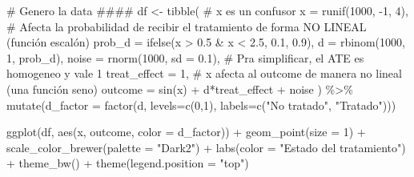 \documentclass[
  letterpaper,
  DIV=11,
  numbers=noendperiod,
  oneside]{scrreprt}
\newenvironment{Shaded}{\begin{snugshade}}{\end{snugshade}}
\newcommand{\AttributeTok}[1]{\textcolor[rgb]{0.40,0.45,0.13}{#1}}
\newcommand{\CommentTok}[1]{\textcolor[rgb]{0.37,0.37,0.37}{#1}}
\newcommand{\DecValTok}[1]{\textcolor[rgb]{0.68,0.00,0.00}{#1}}
\newcommand{\FloatTok}[1]{\textcolor[rgb]{0.68,0.00,0.00}{#1}}
\newcommand{\FunctionTok}[1]{\textcolor[rgb]{0.28,0.35,0.67}{#1}}
\newcommand{\NormalTok}[1]{\textcolor[rgb]{0.00,0.23,0.31}{#1}}
\newcommand{\OtherTok}[1]{\textcolor[rgb]{0.00,0.23,0.31}{#1}}
\newcommand{\SpecialCharTok}[1]{\textcolor[rgb]{0.37,0.37,0.37}{#1}}
\newcommand{\StringTok}[1]{\textcolor[rgb]{0.13,0.47,0.30}{#1}}
\begin{document}
\begin{Shaded}
\begin{Highlighting}[]
\CommentTok{\# Genero la data \#\#\#\#}
\NormalTok{df }\OtherTok{\textless{}{-}} \FunctionTok{tibble}\NormalTok{(}
  \CommentTok{\# x es un confusor}
  \AttributeTok{x =} \FunctionTok{runif}\NormalTok{(}\DecValTok{1000}\NormalTok{, }\SpecialCharTok{{-}}\DecValTok{1}\NormalTok{, }\DecValTok{4}\NormalTok{),}
  \CommentTok{\# Afecta la probabilidad de recibir el tratamiento de forma NO LINEAL (función escalón)}
  \AttributeTok{prob\_d =} \FunctionTok{ifelse}\NormalTok{(x }\SpecialCharTok{\textgreater{}} \FloatTok{0.5} \SpecialCharTok{\&}\NormalTok{ x }\SpecialCharTok{\textless{}} \FloatTok{2.5}\NormalTok{, }\FloatTok{0.1}\NormalTok{, }\FloatTok{0.9}\NormalTok{),}
  \AttributeTok{d =} \FunctionTok{rbinom}\NormalTok{(}\DecValTok{1000}\NormalTok{, }\DecValTok{1}\NormalTok{, prob\_d),}
  \AttributeTok{noise =} \FunctionTok{rnorm}\NormalTok{(}\DecValTok{1000}\NormalTok{, }\AttributeTok{sd =} \FloatTok{0.1}\NormalTok{),}
  \CommentTok{\# Pra simplificar, el ATE es homogeneo y vale 1}
  \AttributeTok{treat\_effect =} \DecValTok{1}\NormalTok{,}
  \CommentTok{\# x afecta al outcome de manera no lineal (una función seno)}
  \AttributeTok{outcome =} \FunctionTok{sin}\NormalTok{(x) }\SpecialCharTok{+}\NormalTok{ d}\SpecialCharTok{*}\NormalTok{treat\_effect }\SpecialCharTok{+}\NormalTok{ noise}
\NormalTok{) }\SpecialCharTok{\%\textgreater{}\%} 
  \FunctionTok{mutate}\NormalTok{(}\AttributeTok{d\_factor =} \FunctionTok{factor}\NormalTok{(d,}
                           \AttributeTok{levels=}\FunctionTok{c}\NormalTok{(}\DecValTok{0}\NormalTok{,}\DecValTok{1}\NormalTok{), }\AttributeTok{labels=}\FunctionTok{c}\NormalTok{(}\StringTok{"No tratado"}\NormalTok{,}
                                                   \StringTok{"Tratado"}\NormalTok{)))}

\FunctionTok{ggplot}\NormalTok{(df,}
       \FunctionTok{aes}\NormalTok{(x, outcome, }\AttributeTok{color =}\NormalTok{ d\_factor)) }\SpecialCharTok{+}
  \FunctionTok{geom\_point}\NormalTok{(}\AttributeTok{size =} \DecValTok{1}\NormalTok{) }\SpecialCharTok{+} 
  \FunctionTok{scale\_color\_brewer}\NormalTok{(}\AttributeTok{palette =} \StringTok{"Dark2"}\NormalTok{) }\SpecialCharTok{+}
  \FunctionTok{labs}\NormalTok{(}\AttributeTok{color =} \StringTok{"Estado del tratamiento"}\NormalTok{) }\SpecialCharTok{+}
  \FunctionTok{theme\_bw}\NormalTok{() }\SpecialCharTok{+}
  \FunctionTok{theme}\NormalTok{(}\AttributeTok{legend.position =} \StringTok{"top"}\NormalTok{)}
\end{Highlighting}
\end{Shaded}
\end{document}
